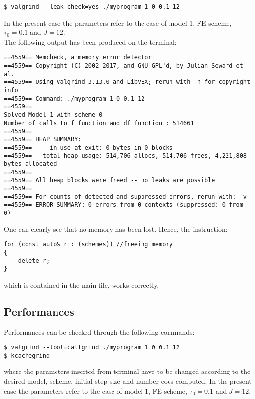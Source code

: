 \documentclass[11pt]{article}
\theoremstyle{theorem}
\theoremstyle{definition}
\begin{document}
\begin{lstlisting}
$ valgrind --leak-check=yes ./myprogram 1 0 0.1 12
\end{lstlisting}

In the present case the parameters refer to the case of model 1, FE scheme, $\tau_0=0.1$ and $J=12$.\\

The following output has been produced on the terminal:

\begin{verbatim}
==4559== Memcheck, a memory error detector
==4559== Copyright (C) 2002-2017, and GNU GPL'd, by Julian Seward et al.
==4559== Using Valgrind-3.13.0 and LibVEX; rerun with -h for copyright info
==4559== Command: ./myprogram 1 0 0.1 12
==4559== 
Solved Model 1 with scheme 0
Number of calls to f function and df function : 514661
==4559== 
==4559== HEAP SUMMARY:
==4559==     in use at exit: 0 bytes in 0 blocks
==4559==   total heap usage: 514,706 allocs, 514,706 frees, 4,221,808 bytes allocated
==4559== 
==4559== All heap blocks were freed -- no leaks are possible
==4559== 
==4559== For counts of detected and suppressed errors, rerun with: -v
==4559== ERROR SUMMARY: 0 errors from 0 contexts (suppressed: 0 from 0)
\end{verbatim}

One can clearly see that no memory has been lost. Hence, the instruction:

\begin{lstlisting}
for (const auto& r : (schemes)) //freeing memory
{
	delete r;
}
\end{lstlisting}

which is contained in the main file, works correctly.\\

\subsection{Performances}
\label{subsec:perf}
Performances can be checked through the following commands:
\begin{verbatim}
$ valgrind --tool=callgrind ./myprogram 1 0 0.1 12
$ kcachegrind
\end{verbatim}

where the parameters inserted from terminal have to be changed according to the desired model, scheme, initial step size and number eocs computed. In the present case the parameters refer to the case of model 1, FE scheme, $\tau_0=0.1$ and $J=12$.  
\end{document}
